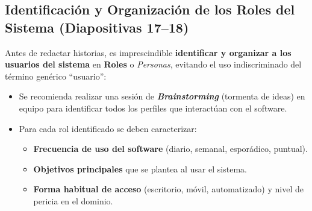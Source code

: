 \subsection{Identificación y Organización de los Roles del Sistema (Diapositivas 17--18)}

Antes de redactar historias, es imprescindible \textbf{identificar y organizar a los usuarios del sistema} en \textbf{Roles} o \textit{Personas}, evitando el uso indiscriminado del término genérico ``usuario'':
\begin{itemize}[itemsep=3pt]
    \item Se recomienda realizar una sesión de \textbf{\textit{Brainstorming}} (tormenta de ideas) en equipo para identificar todos los perfiles que interactúan con el software.
    \item Para cada rol identificado se deben caracterizar:
    \begin{itemize}
        \item \textbf{Frecuencia de uso del software} (diario, semanal, esporádico, puntual).
        \item \textbf{Objetivos principales} que se plantea al usar el sistema.
        \item \textbf{Forma habitual de acceso} (escritorio, móvil, automatizado) y nivel de pericia en el dominio.
    \end{itemize}
\end{itemize}


